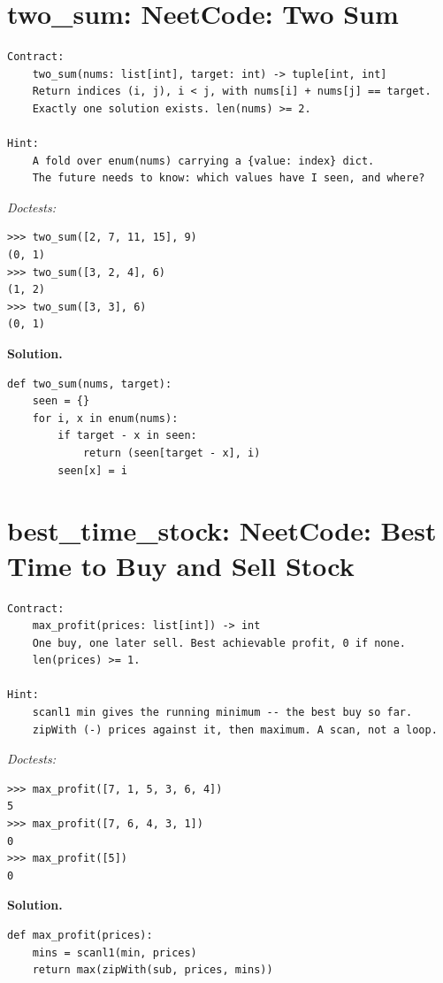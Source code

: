 \documentclass[11pt,letterpaper]{book}
\begin{document}
\section{two\_sum: NeetCode: Two Sum}
\begin{lstlisting}[style=spec]
Contract:
    two_sum(nums: list[int], target: int) -> tuple[int, int]
    Return indices (i, j), i < j, with nums[i] + nums[j] == target.
    Exactly one solution exists. len(nums) >= 2.

Hint:
    A fold over enum(nums) carrying a {value: index} dict.
    The future needs to know: which values have I seen, and where?
\end{lstlisting}
\noindent\textit{Doctests:}
\begin{lstlisting}[style=spec]
>>> two_sum([2, 7, 11, 15], 9)
(0, 1)
>>> two_sum([3, 2, 4], 6)
(1, 2)
>>> two_sum([3, 3], 6)
(0, 1)
\end{lstlisting}
\noindent\textbf{Solution.}
\begin{lstlisting}[style=code]
def two_sum(nums, target):
    seen = {}
    for i, x in enum(nums):
        if target - x in seen:
            return (seen[target - x], i)
        seen[x] = i
\end{lstlisting}

\section{best\_time\_stock: NeetCode: Best Time to Buy and Sell Stock}
\begin{lstlisting}[style=spec]
Contract:
    max_profit(prices: list[int]) -> int
    One buy, one later sell. Best achievable profit, 0 if none.
    len(prices) >= 1.

Hint:
    scanl1 min gives the running minimum -- the best buy so far.
    zipWith (-) prices against it, then maximum. A scan, not a loop.
\end{lstlisting}
\noindent\textit{Doctests:}
\begin{lstlisting}[style=spec]
>>> max_profit([7, 1, 5, 3, 6, 4])
5
>>> max_profit([7, 6, 4, 3, 1])
0
>>> max_profit([5])
0
\end{lstlisting}
\noindent\textbf{Solution.}
\begin{lstlisting}[style=code]
def max_profit(prices):
    mins = scanl1(min, prices)
    return max(zipWith(sub, prices, mins))
\end{lstlisting}
\end{document}
